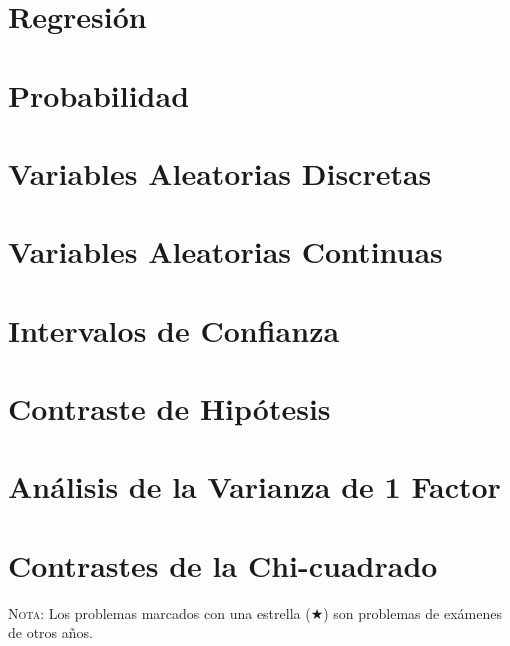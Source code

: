 \documentclass[a4paper,titlepage]{article}
\begin{document}
\section{Regresión}
\begin{enumerate}[leftmargin=*]
\end{enumerate}

\section{Probabilidad}
\begin{enumerate}[leftmargin=*]
\end{enumerate}

\section{Variables Aleatorias Discretas}
\begin{enumerate}[leftmargin=*]
\end{enumerate}

\section{Variables Aleatorias Continuas}
\begin{enumerate}[leftmargin=*]
\end{enumerate}

\section{Intervalos de Confianza}
\begin{enumerate}[leftmargin=*]
\end{enumerate}

\section{Contraste de Hipótesis}
\begin{enumerate}[leftmargin=*]
\end{enumerate}

\section{Análisis de la Varianza de 1 Factor}
\begin{enumerate}[leftmargin=*]
\end{enumerate}

\section{Contrastes de la Chi-cuadrado}
\begin{enumerate}[leftmargin=*]
\end{enumerate}


\vspace{2cm}

\textsc{Nota}: Los problemas marcados con una estrella ($\bigstar$) son problemas de exámenes de otros años.
\end{document}
